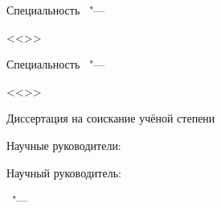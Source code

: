 \begin{center}
\textbf {\large %
\ttlTitle}

\vspace{0pt plus2fill} %
{%
Специальность \thesisSpecialtyNumber\ "---

<<\ttlSpecialtyTitle>>
}

\ifdefined\thesisSpecialtyTwoNumber
{%
Специальность \thesisSpecialtyTwoNumber\ "---

<<\thesisSpecialtyTwoTitle>>
}
\fi

\vspace{0pt plus2fill} %
Диссертация на соискание учёной степени

\ttlDegree
\end{center}
%
\vspace{0pt plus4fill} %
\begin{flushright}
\ifdefined\supervisorTwoFio
Научные руководители:

\ttlSupervisorRegalia

\ifdefined\supervisorDead
\framebox{\ttlSupervisorFio}
\else
\ttlSupervisorFio
\fi

\supervisorTwoRegalia

\ifdefined\supervisorTwoDead
\framebox{\supervisorTwoFio}
\else
\supervisorTwoFio
\fi
\else
Научный руководитель:

\ttlSupervisorRegalia

\ifdefined\supervisorDead
\framebox{\ttlSupervisorFio}
\else
\ttlSupervisorFio
\fi
\fi

\end{flushright}
%
\vspace{0pt plus4fill} %
{\centering\ttlCity\ "--- \thesisYear\par}
